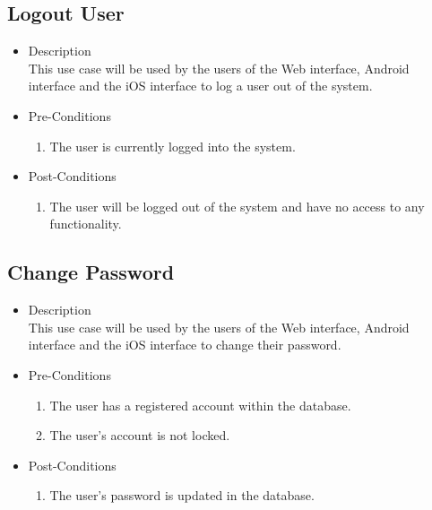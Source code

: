 \documentclass[11pt,fleqn]{book} %
\begin{document}
		\subsection{Logout User}
			\begin{itemize}
				\item Description\\
				This use case will be used by the users of the Web interface, Android interface and the iOS interface to log a user out of the system.
				\item Pre-Conditions
				\begin{enumerate}
					\item The user is currently logged into the system.
				\end{enumerate}
				\item Post-Conditions
				\begin{enumerate}
					\item The user will be logged out of the system and have no access to any functionality.
				\end{enumerate}
			\end{itemize}
			
		\subsection{Change Password}
			\begin{itemize}
				\item Description\\
				This use case will be used by the users of the Web interface, Android interface and the iOS interface to change their password.
				\item Pre-Conditions
				\begin{enumerate}
					\item The user has a registered account within the database.
					\item The user’s account is not locked.
				\end{enumerate}
				\item Post-Conditions
				\begin{enumerate}
					\item The user’s password is updated in the database. 
				\end{enumerate}
			\end{itemize}
			
\end{document}
